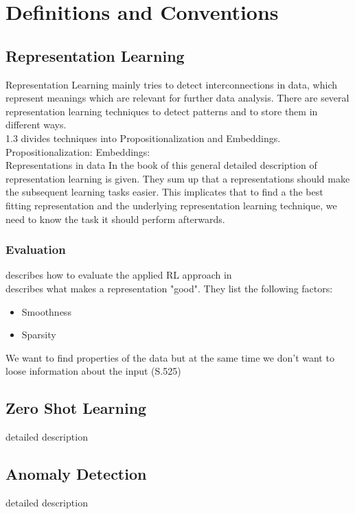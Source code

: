 \chapter{Definitions and Conventions}\label{theory}
\section{Representation Learning}
Representation Learning mainly tries to detect interconnections in data, which represent meanings which are relevant for further data analysis. There are several representation learning techniques to detect patterns and to store them in different ways.\\
\cite{lavrac_representation_2021} 1.3
divides techniques into Propositionalization and Embeddings.\\
Propositionalization:
Embeddings:\\
Representations in data
In the book of \cite{goodfellow_deep_2016} this general detailed description of representation learning is given. They sum up that a representations should make the subsequent learning tasks easier. This implicates that to find a the best fitting representation and the underlying representation learning technique, we need to know the task it should perform afterwards.
\subsection{Evaluation}
describes how to evaluate the applied RL approach in\\
\cite{bengio_representation_2013} describes what makes a representation "good". They list the following factors:\\
\begin{itemize}
  \item Smoothness
  \item Sparsity
\end{itemize}We want to find properties of the data but at the same time we don't want to loose information about the input \cite{goodfellow_deep_2016} (S.525)
\section{Zero Shot Learning}
detailed description
\section{Anomaly Detection}
detailed description
